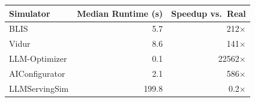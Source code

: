 \begin{tabular}{lrr}
\toprule
Simulator & Median Runtime (s) & Speedup vs.\ Real \\
\midrule
BLIS & 5.7 & 212$\times$ \\
Vidur & 8.6 & 141$\times$ \\
LLM-Optimizer & 0.1 & 22562$\times$ \\
AIConfigurator & 2.1 & 586$\times$ \\
LLMServingSim & 199.8 & 0.2$\times$ \\
\bottomrule
\end{tabular}